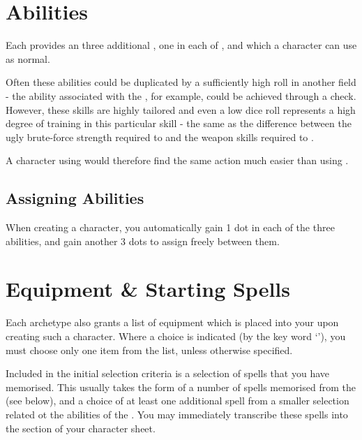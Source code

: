 \section{ Abilities} 

Each  provides an three additional , one in each of ,  and  which a character can use as normal. 

Often these abilities could be duplicated by a sufficiently high roll in another field - the  ability associated with the , for example, could be achieved through a  check. However, these skills are highly tailored and even a low dice roll represents a high degree of training in this particular skill - the same as the difference between the ugly brute-force strength required to  and the weapon skills required to .

A character using  would therefore find the same action much easier than using . 

\subsection{Assigning  Abilities} 

When creating a character, you automatically gain 1 dot in each of the three  abilities, and gain another 3 dots to assign freely between them.  

\section{ Equipment \& Starting Spells}

Each archetype also grants a list of equipment which is placed into your  upon creating such a character. Where a choice is indicated (by the key word `'), you must choose only one item from the list, unless otherwise specified. 


Included in the initial selection criteria is a selection of spells that you have memorised. This usually takes the form of a number of spells memorised from the  (see below), and a choice of at least one additional spell from a smaller selection related ot the abilities of the . You may immediately transcribe these spells into the  section of your character sheet. 

